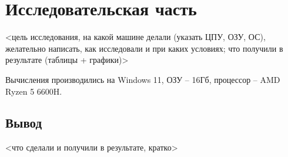 \chapter{Исследовательская часть}

<цель исследования, на какой машине делали (указать ЦПУ, ОЗУ, ОС), желательно написать, как исследовали и при каких условиях; что получили в результате (таблицы + графики)>

Вычисления производились на Windows 11, ОЗУ -- 16Гб, процессор -- AMD Ryzen 5 6600H.

\section{Вывод}

<что сделали и получили в результате, кратко>

\clearpage
